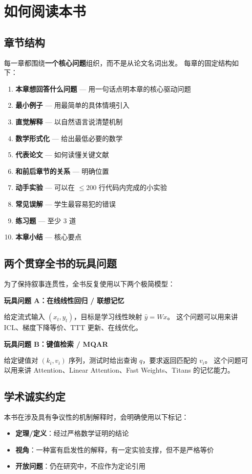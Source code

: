 \chapter*{如何阅读本书}

\section*{章节结构}

每一章都围绕\textbf{一个核心问题}组织，而不是从论文名词出发。
每章的固定结构如下：

\begin{enumerate}
  \item \textbf{本章想回答什么问题} — 用一句话点明本章的核心驱动问题
  \item \textbf{最小例子} — 用最简单的具体情境引入
  \item \textbf{直觉解释} — 以自然语言说清楚机制
  \item \textbf{数学形式化} — 给出最低必要的数学
  \item \textbf{代表论文} — 如何读懂关键文献
  \item \textbf{和前后章节的关系} — 明确位置
  \item \textbf{动手实验} — 可以在 $\leq 200$ 行代码内完成的小实验
  \item \textbf{常见误解} — 学生最容易犯的错误
  \item \textbf{练习题} — 至少 3 道
  \item \textbf{本章小结} — 核心要点
\end{enumerate}

\section*{两个贯穿全书的玩具问题}

为了保持叙事连贯性，全书反复使用以下两个极简模型：

\begin{toybox}
\textbf{玩具问题 A：在线线性回归 / 联想记忆}

给定流式输入 $(x_t, y_t)$，目标是学习线性映射 $\hat{y} = W x$。
这个问题可以用来讲 ICL、梯度下降等价、TTT 更新、在线优化。
\end{toybox}

\begin{toybox}
\textbf{玩具问题 B：键值检索 / MQAR}

给定键值对 $(k_i, v_i)$ 序列，测试时给出查询 $q$，要求返回匹配的 $v_i$。
这个问题可以用来讲 Attention、Linear Attention、Fast Weights、Titans 的记忆能力。
\end{toybox}

\section*{学术诚实约定}

本书在涉及具有争议性的机制解释时，会明确使用以下标记：

\begin{itemize}
  \item \textbf{定理/定义}：经过严格数学证明的结论
  \item \textbf{视角}：一种富有启发性的解释，有一定实验支撑，但不是严格等价
  \item \textbf{开放问题}：仍在研究中，不应作为定论引用
\end{itemize}
